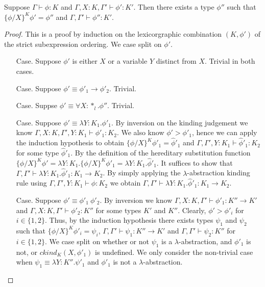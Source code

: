 \begin{lemma}
  \label{lemma:total_tl_ssfw}
  Suppose $\Gamma \vdash \phi : K$ and $\Gamma, X:K, \Gamma' \vdash \phi':K'$. Then
  there exists a type $\phi''$ such that $\{\phi/X\}^K \phi' = \phi''$ and $\Gamma,\Gamma' \vdash \phi'':K'$.
\end{lemma}
\begin{proof}
  This is a proof by induction on the lexicorgraphic combination $(K,
  \phi')$ of the strict subexpression ordering.  We case split on $\phi'$.
  
  \begin{itemize}
  \item[Case.] Suppose $\phi'$ is either $X$ or a variable $Y$ distinct from $X$.  
    Trivial in both cases.

  \item[Case.] Suppose $\phi' \equiv \phi'_1 \to \phi'_2$.  Trivial.
    
  \item[Case.] Suppse $\phi' \equiv \forall X:*_l.\phi''$.  Trivial.
    
  \item[Case.] Suppose $\phi' \equiv \lambda Y:K_1.\phi'_1$.  By inversion on the
    kinding judgement we know $\Gamma,X:K,\Gamma',Y:K_1 \vdash \phi'_1:K_2$.
    We also know $\phi' > \phi'_1$, hence we can apply the induction hypothesis to obtain
    $\{\phi/X\}^K \phi'_1 = \hat{\phi}'_1$ and $\Gamma,\Gamma',Y:K_1 \vdash \hat{\phi}'_1:K_2$
    for some type $\hat{\phi}'_1$.  By the definition of the hereditary substitution function 
    $\{\phi/X\}^K \phi' = \lambda Y:K_1.\{\phi/X\}^K \phi'_1 = \lambda Y:K_1.\hat{\phi}'_1$.  It suffices
    to show that $\Gamma,\Gamma' \vdash \lambda Y:K_1.\hat{\phi}'_1:K_1 \to K_2$.  
    By simply applying the $\lambda$-abstraction kinding rule using
    $\Gamma,\Gamma',Y:K_1 \vdash \hat{\phi}:K_2$ we obtain 
    $\Gamma,\Gamma' \vdash \lambda Y:K_1.\hat{\phi}'_1:K_1 \to K_2$.
    
  \item[Case.] Suppose $\phi' \equiv \phi'_1\ \phi'_2$.  By inversion we know
    $\Gamma, X:K, \Gamma' \vdash \phi'_1 : K'' \to K'$ and
    $\Gamma, X:K, \Gamma' \vdash \phi'_2 : K''$ for some types $K'$ and $K''$.
    Clearly, $\phi' > \phi'_i$ for $i \in \{1,2\}$.  Thus, by the induction hypothesis
    there exists types $\psi_1$ and $\psi_2$ such that $\{\phi/X\}^K \phi'_i = \psi_i$,
    $\Gamma, \Gamma' \vdash \psi_1 : K'' \to K'$ and
    $\Gamma, \Gamma' \vdash \psi_2 : K''$ for
    $i \in \{1,2\}$.  We case split on whether or not $\psi_1$ is a $\lambda$-abstraction,
    and $\phi'_1$ is not, or $ckind_K(X,\phi'_1)$ is undefined.  
    We only consider the non-trivial case when 
    $\psi_1 \equiv \lambda Y:K''.\psi'_1$ and $\phi'_1$ is not a $\lambda$-abstraction.
    

\end{itemize}
\end{proof}
